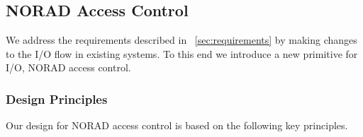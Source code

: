 \documentclass[withindex,glossary]{cam-thesis}
\begin{document}
\subsection{NORAD Access Control}

We address the requirements described in ~\ref{sec:requirements} by making changes to the I/O flow in existing systems.
To this end we introduce a new primitive for I/O, NORAD access control.

\subsubsection{Design Principles} 
Our design for NORAD access control is based on the following key principles.
\end{document}

